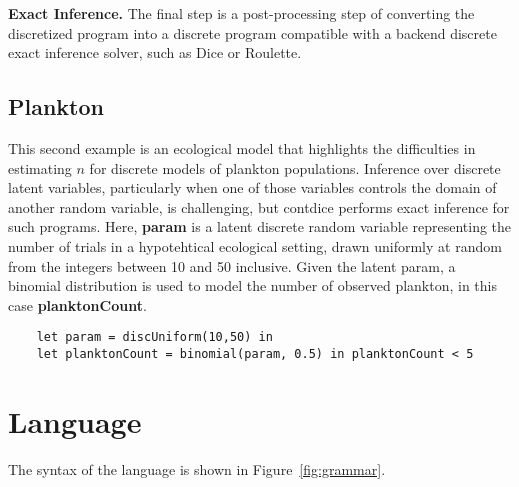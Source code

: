 \documentclass[acmsmall,screen,dvipsnames,x11names,nonacm,anonymous,review]{acmart}
\newcommand{\CDice}{\text{\scshape CDice}\xspace}
\begin{document}
\textbf{Exact Inference.} The final step is a post-processing step of converting the discretized program into a discrete program compatible with a backend discrete exact inference solver, such as Dice or Roulette.

\subsection{Plankton}
This second example is an ecological model that highlights the difficulties in estimating $n$ for discrete models of plankton populations. Inference over discrete latent variables, particularly when one of those variables controls the domain of another random variable, is challenging, but contdice performs exact inference for such programs. Here, \textbf{param} is a latent discrete random variable representing the number of trials in a hypotehtical ecological setting, drawn uniformly at random from the integers between 10 and 50 inclusive. Given the latent param, a binomial distribution is used to model the number of observed plankton, in this case \textbf{planktonCount}.

\begin{lstlisting}
    let param = discUniform(10,50) in
    let planktonCount = binomial(param, 0.5) in planktonCount < 5
\end{lstlisting}





\section{Language}

The syntax of the \CDice language is shown in Figure~\ref{fig:grammar}.
\end{document}
